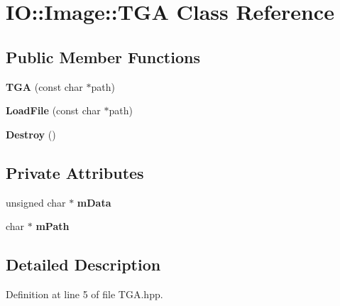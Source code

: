 \hypertarget{class_i_o_1_1_image_1_1_t_g_a}{}\section{IO\+:\+:Image\+:\+:T\+GA Class Reference}
\label{class_i_o_1_1_image_1_1_t_g_a}
\subsection*{Public Member Functions}
\begin{DoxyCompactItemize}
\item 
{\bfseries T\+GA} (const char $\ast$path)\hypertarget{class_i_o_1_1_image_1_1_t_g_a_a077099e9e9d2af33e1988ad914df0366}{}\label{class_i_o_1_1_image_1_1_t_g_a_a077099e9e9d2af33e1988ad914df0366}

\item 
{\bfseries Load\+File} (const char $\ast$path)\hypertarget{class_i_o_1_1_image_1_1_t_g_a_a1012210e7040fcd0b3fe479b3928895a}{}\label{class_i_o_1_1_image_1_1_t_g_a_a1012210e7040fcd0b3fe479b3928895a}

\item 
{\bfseries Destroy} ()\hypertarget{class_i_o_1_1_image_1_1_t_g_a_a9421b7655f2dbad66e517e58779f8fc9}{}\label{class_i_o_1_1_image_1_1_t_g_a_a9421b7655f2dbad66e517e58779f8fc9}

\end{DoxyCompactItemize}
\subsection*{Private Attributes}
\begin{DoxyCompactItemize}
\item 
unsigned char $\ast$ {\bfseries m\+Data}\hypertarget{class_i_o_1_1_image_1_1_t_g_a_a5a2070265adbff7816494a56ee9a155b}{}\label{class_i_o_1_1_image_1_1_t_g_a_a5a2070265adbff7816494a56ee9a155b}

\item 
char $\ast$ {\bfseries m\+Path}\hypertarget{class_i_o_1_1_image_1_1_t_g_a_a1945a4a3254866cdb4600eb77d94b029}{}\label{class_i_o_1_1_image_1_1_t_g_a_a1945a4a3254866cdb4600eb77d94b029}

\end{DoxyCompactItemize}


\subsection{Detailed Description}


Definition at line 5 of file T\+G\+A.\+hpp.

